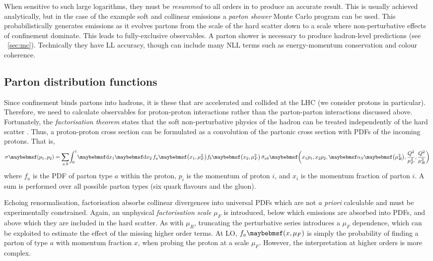 When sensitive to such large logarithms, they must be \textit{resummed} to all orders in 
\alphaS to produce an accurate result. This is usually achieved analytically, but in the 
case of the example soft and collinear emissions a \textit{parton shower} Monte Carlo 
program can be used. This probabilistically generates emissions as it evolves partons 
from the scale of the hard scatter down to a scale where non-perturbative effects of 
confinement dominate. This leads to fully-exclusive observables. A parton shower is 
necessary to produce hadron-level predictions (see \Section~\ref{sec:mc}). Technically 
they have \ac{LL} accuracy, though can include many \ac{NLL} terms such as 
energy-momentum conservation and colour coherence.



\subsection{Parton distribution functions}
\label{sec:qcd:pdf}

Since confinement binds partons into hadrons, it is these that are accelerated and 
collided at the \acs{LHC} (we consider protons in particular). Therefore, we need to 
calculate observables for proton-proton interactions rather than the parton-parton 
interactions discussed above. Fortunately, the \textit{factorisation theorem} states that 
the soft non-perturbative physics of the hadron can be treated independently of the hard 
scatter \cite{Collins:1982}. Thus, a proton-proton cross section can be formulated as a 
convolution of the partonic cross section with \acp{PDF} of the incoming protons. That is,
\begin{equation}
	\sigma\parenths{p_1, p_2} = 
	\sum\limits_{a, b} \! \int_0^1 \! \d{x_1} \d{x_2} \,
	f_a \parenths{x_1, \mu_F^2} f_b \parenths{x_2, \mu_F^2} \,
	\hat{\sigma}_{ab} \parenths{x_1 p_1, x_2 p_2, \alphaS\parenths{\mu_R^2}, \frac{Q^2}{\mu_F^2}, \frac{Q^2}{\mu_R^2}} 
\end{equation}
where $f_a$ is the \ac{PDF} of parton type $a$ within the proton, $p_i$ is the momentum 
of proton $i$, and $x_i$ is the momentum fraction of parton $i$. A sum is performed over 
all possible parton types (six quark flavours and the gluon).

Echoing renormalisation, factorisation absorbs collinear divergences into universal 
\acp{PDF} which are not \textit{a priori} calculable and must be experimentally 
constrained. Again, an unphysical \textit{factorisation scale} $\mu_F$ is introduced, 
below which emissions are absorbed into \acp{PDF}, and above which they are included in 
the hard scatter. As with $\mu_R$, truncating the perturbative series introduces a 
$\mu_F$ dependence, which can be exploited to estimate the effect of the missing higher 
order terms. At \ac{LO}, $f_a \parenths{x, \mu_F}$ is simply the probability of finding a 
parton of type $a$ with momentum fraction $x$, when probing the proton at a scale $\mu_F$.
However, the interpretation at higher orders is more complex.

